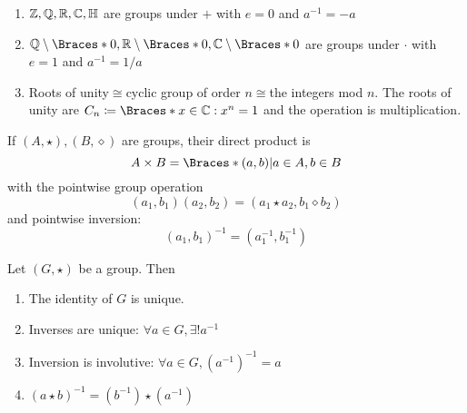 \documentclass[a5paper]{article}
\begin{document}
\begin{example}
	\begin{enumerate}
    \item $\mathbb{Z},\mathbb{Q},\mathbb{R},\mathbb{C},\mathbb{H}$ are groups under $+$ with $e=0$ and $a^{-1}=-a$
    \item $\Q\setminus\braces{0},\R\setminus\braces{0},\C\setminus\braces{0}$
      are groups under $\cdot$ with $e=1$ and $a^{-1}=1/a$
    \item Roots of unity$\cong$cyclic group of order $n$$\cong$the integers mod
      $n$. The roots of unity are $C_n\coloneqq\braces{x\in\C:x^n=1}$ and the
      operation is multiplication.
  \end{enumerate}
\end{example}

\begin{definition}
	If $(A,\star),(B,\diamond)$ are groups, their direct product is
  \begin{equation*}
    A\times B=\braces{(a,b)|a\in A, b\in B}
  \end{equation*}
  with the pointwise group operation
  \begin{equation*}
    (a_1,b_1)(a_2,b_2)=(a_1\star a_2,b_1\diamond b_2)
  \end{equation*}
  and pointwise inversion:
  \begin{equation*}
    (a_1,b_1)^{-1} = (a_1^{-1},b_1^{-1})
  \end{equation*}
\end{definition}

\begin{theorem}
  Let $(G,\star)$ be a group. Then
	\begin{enumerate}%
    \item The identity of $G$ is unique.
    \item Inverses are unique: $\forall a\in G,\exists!a^{-1}$
    \item Inversion is involutive: $\forall a\in G,(a^{-1})^{-1}=a$
    \item $(a\star b)^{-1}=(b^{-1})\star (a^{-1})$
  \end{enumerate}
\end{theorem}
\end{document}

